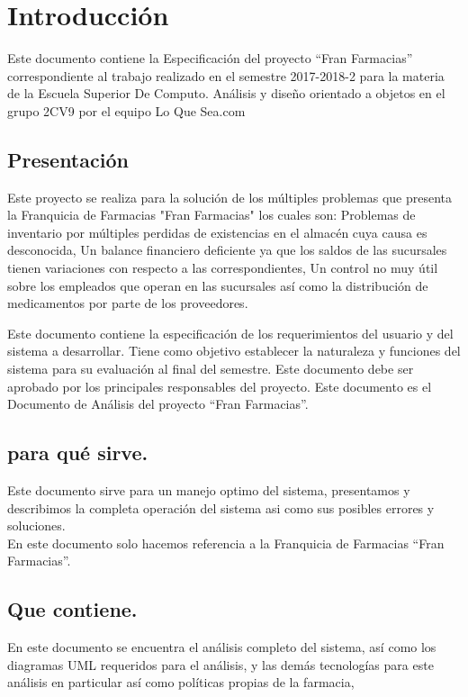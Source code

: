 \chapter{Introducción}
Este documento contiene la Especificación del proyecto “Fran Farmacias” correspondiente al trabajo realizado en el
semestre 2017-2018-2 para la materia de la Escuela Superior De Computo. Análisis y diseño orientado a objetos en el
grupo 2CV9 por el equipo Lo Que Sea.com

\section{Presentación}
Este proyecto se realiza para la solución de los múltiples problemas que presenta la Franquicia de Farmacias "Fran Farmacias" los cuales son: Problemas de inventario por múltiples perdidas de existencias en el almacén cuya causa es desconocida, Un balance financiero deficiente ya que los saldos de las sucursales tienen variaciones con respecto a las correspondientes, Un control no muy útil sobre los  empleados que operan en las sucursales así como la distribución de medicamentos por parte de los proveedores.

Este documento contiene la especificación de los requerimientos del usuario y del sistema a desarrollar.
Tiene como objetivo establecer la naturaleza y funciones del sistema para su evaluación al final del semestre. 
Este documento debe ser aprobado por los principales responsables del proyecto.
Este documento es el Documento de Análisis del proyecto “Fran Farmacias”.

\section{para qué sirve.}
Este documento sirve para un manejo optimo del sistema, presentamos y describimos la completa operación del sistema asi como sus posibles errores y soluciones.\\
En este documento solo hacemos referencia a la Franquicia de Farmacias “Fran Farmacias”.
\section{Que contiene.}
En este documento se encuentra el análisis completo del sistema, así como los diagramas UML requeridos para el análisis, y las demás tecnologías para este análisis en particular así como políticas propias de la farmacia,

